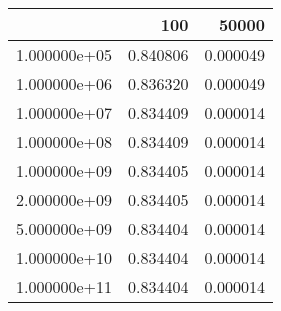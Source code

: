 \begin{tabular}{lrr}
\toprule
{} &     100   &     50000 \\
\midrule
1.000000e+05 &  0.840806 &  0.000049 \\
1.000000e+06 &  0.836320 &  0.000049 \\
1.000000e+07 &  0.834409 &  0.000014 \\
1.000000e+08 &  0.834409 &  0.000014 \\
1.000000e+09 &  0.834405 &  0.000014 \\
2.000000e+09 &  0.834405 &  0.000014 \\
5.000000e+09 &  0.834404 &  0.000014 \\
1.000000e+10 &  0.834404 &  0.000014 \\
1.000000e+11 &  0.834404 &  0.000014 \\
\bottomrule
\end{tabular}
